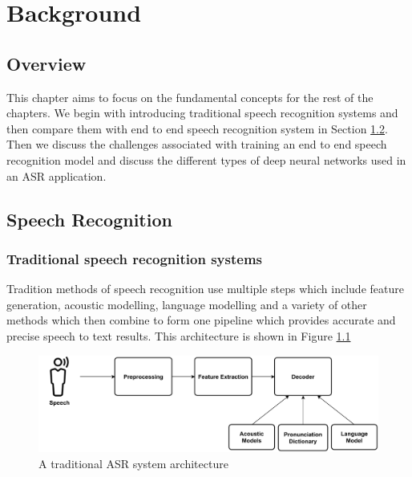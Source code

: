 \chapter{Background}
\label{chapter:background} 

\section{Overview}
This chapter aims to focus on the fundamental concepts for the rest of the chapters. We begin with introducing traditional speech recognition systems and then compare them with end to end speech recognition system in Section \ref{section:asr}. Then we discuss the challenges associated with training an end to end speech recognition model and discuss the different types of deep neural networks used in an ASR application.

\section{Speech Recognition}
\label{section:asr}

\subsection{Traditional speech recognition systems}
\label{section:tradasr}
Tradition methods of speech recognition use multiple steps which include feature generation, acoustic modelling, language modelling and a variety of other methods which then combine to form one pipeline which provides accurate and precise speech to text results. This architecture is shown in Figure \ref{fig:trad_asr_model}

\begin{figure}[ht]
  \begin{center}
    \includegraphics[width=\textwidth]{images/Tradition ASR System.pdf} 
    \caption{A traditional ASR system architecture}
    \label{fig:trad_asr_model}
  \end{center}
\end{figure}


